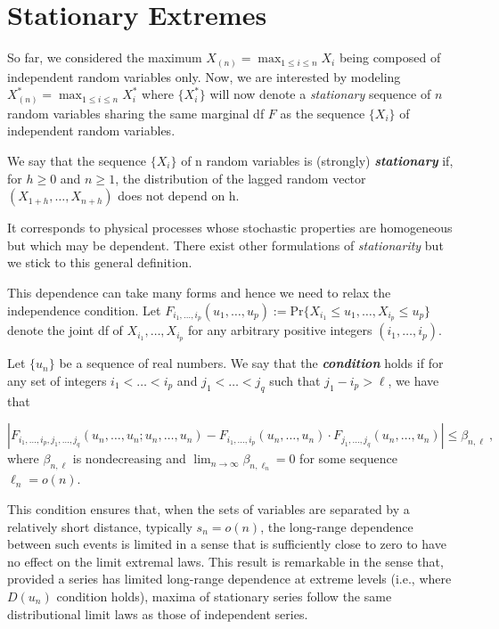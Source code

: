\section{Stationary Extremes}\label{sec:statio}

So far, we considered the maximum $X_{(n)}=\max_{1\leq i\leq n}X_i$ being composed of independent random variables only. 
 Now, we are interested by modeling 
$X^*_{(n)}=\max_{1\leq i\leq n}X^*_i$ where $\{X^*_i\}$ will now denote a \emph{stationary} 
sequence of $n$ random variables sharing the same marginal df $F$ as the sequence $\{X_i\}$ of independent random variables.

\begin{definition} We say that the sequence $\{X_i\}$ of n random variables is (strongly) \emph{\textbf{stationary}} if, for $h\geq 0$ and $n\geq 1$, the distribution of the lagged random vector $(X_{1+h},\dots,X_{n+h})$ does not depend on h.
\end{definition}
It corresponds to physical processes whose stochastic properties are homogeneous but which may be dependent. There exist other formulations of \emph{stationarity} but we stick to this general definition.  

This dependence can take many forms and hence we need to relax the independence condition.
Let $F_{i_1,\dots,i_p}(u_1,\dots,u_p):=\text{Pr}\{X_{i_1}\leq 
u_1,\dots,X_{i_p}\leq u_p\}$ denote the joint df of 
$X_{i_1},\dots,X_{i_p}$ for any arbitrary positive integers $(i_1,\dots,i_p)$.

\begin{definition} 
	Let $\{u_n\}$ be a sequence of real numbers. We say that the \emph{  \textbf{condition}} holds if for any set of integers $i_1<\dots<i_p$ and $j_1<\dots<j_q$ such that $j_1-i_p>\ell$, we have that 
	
	\begin{equation}
	|F_{i_1,\dots,i_p,j_1,\dots,j_q}(u_n,\dots,u_n;u_n,\dots,u_n)-F_{i_1,\dots,i_p}(u_n,\dots,u_n)\cdot F_{j_1,\dots,j_q}(u_n,\dots, u_n)|\leq \beta_{n,\ell}\ ,
	\end{equation}
	where $\beta_{n,\ell}$ is nondecreasing and  $\displaystyle{\lim_{n \to \infty}}\beta_{n,\ell_n}=0$ for some sequence $\ell_n=o(n)$.
\end{definition}
This condition ensures that, when the sets of variables are separated by a relatively short distance, typically $s_n=o(n)$, the long-range dependence between such events is limited in a sense that is sufficiently close to zero to have no effect on the limit extremal laws.
This result is remarkable in the sense that, provided a series has limited long-range dependence at extreme levels (i.e., where $D(u_n)$ condition holds), maxima of stationary series follow the same distributional limit laws as those of independent series.%


